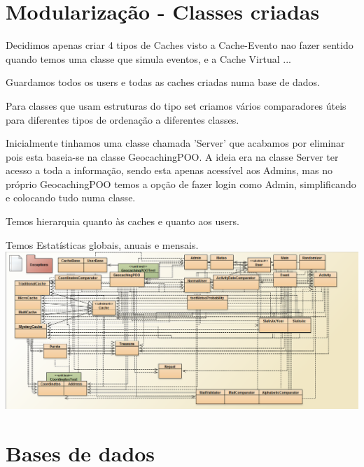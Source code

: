 \documentclass{article}
\begin{document}

\section{Modularização - Classes criadas}

\quad Decidimos apenas criar 4 tipos de Caches visto a Cache-Evento nao fazer sentido quando temos uma classe que simula eventos, e a Cache Virtual ... 
\par Guardamos todos os users e todas as caches criadas numa base de dados.
\par Para classes que usam estruturas do tipo set criamos vários comparadores úteis para diferentes tipos de ordenação a diferentes classes.
\par Inicialmente tinhamos uma classe chamada 'Server' que acabamos por eliminar pois esta baseia-se na classe GeocachingPOO. A ideia era na classe Server ter acesso a toda a informação, sendo esta apenas acessível aos Admins, mas no próprio GeocachingPOO temos a opção de fazer login como Admin, simplificando e colocando tudo numa classe.
\par Temos hierarquia quanto às caches e quanto aos users.
\par Temos Estatísticas globais, anuais e mensais.
\\
\includegraphics[height=8\baselineskip,natwidth=369,natheight=430]{Diagrama.PNG}

\pagebreak
\section{Bases de dados}
\end{document}

